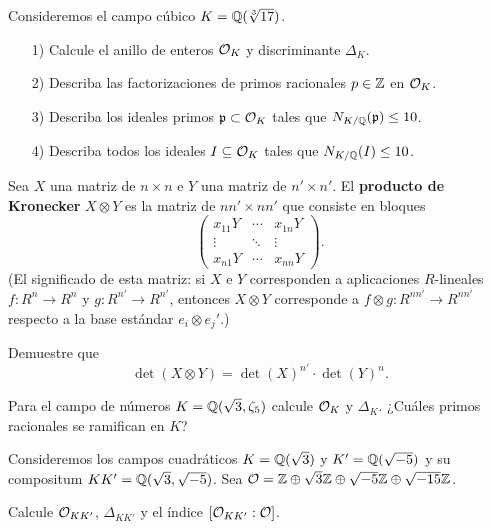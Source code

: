 \begin{ejercicio}
  Consideremos el campo cúbico $K = \mathbb{Q} (\sqrt[3]{17})$.

  \begin{enumerate}
  \item[1)] Calcule el anillo de enteros $\mathcal{O}_K$ y discriminante $\Delta_K$.
  \item[2)] Describa las factorizaciones de primos racionales $p \in \mathbb{Z}$ en
    $\mathcal{O}_K$.
  \item[3)] Describa los ideales primos $\mathfrak{p} \subset \mathcal{O}_K$
    tales que $N_{K/\mathbb{Q}} (\mathfrak{p}) \le 10$.
  \item[4)] Describa todos los ideales $I \subseteq \mathcal{O}_K$
    tales que $N_{K/\mathbb{Q}} (I) \le 10$.
  \end{enumerate}
\end{ejercicio}

\begin{ejercicio}
  \label{ejerc:producto-de-kronecker}
  Sea $X$ una matriz de $n\times n$ e $Y$ una matriz de $n'\times n'$.
  El \textbf{producto de Kronecker} $X\otimes Y$ es la matriz de
  $nn' \times nn'$ que consiste en bloques
  \[ \begin{pmatrix}
    x_{11} Y & \cdots & x_{1n} Y \\
    \vdots & \ddots & \vdots \\
    x_{n1} Y & \cdots & x_{nn} Y
  \end{pmatrix}. \]
  (El significado de esta matriz: si $X$ e $Y$ corresponden a aplicaciones
  $R$-lineales $f\colon R^n \to R^n$ y $g\colon R^{n'}\to R^{n'}$, entonces
  $X\otimes Y$ corresponde a $f\otimes g\colon R^{nn'} \to R^{nn'}$
  respecto a la base estándar $e_i\otimes e_j'$.)

  Demuestre que
  $$\det (X\otimes Y) = \det (X)^{n'} \cdot \det (Y)^n.$$
\end{ejercicio}

\begin{ejercicio}
  Para el campo de números $K = \mathbb{Q} (\sqrt{3},\zeta_5)$ calcule
  $\mathcal{O}_K$ y $\Delta_K$. ¿Cuáles primos racionales se ramifican en $K$?
\end{ejercicio}

\begin{ejercicio}
  Consideremos los campos cuadráticos $K = \mathbb{Q} (\sqrt{3})$ y
  $K' = \mathbb{Q} (\sqrt{-5})$ y su compositum $KK' = \mathbb{Q} (\sqrt{3},\sqrt{-5})$.
  Sea $\mathcal{O} = \mathbb{Z} \oplus \sqrt{3}\mathbb{Z} \oplus \sqrt{-5}\mathbb{Z} \oplus \sqrt{-15}\mathbb{Z}$.

  Calcule $\mathcal{O}_{KK'}$, $\Delta_{KK'}$ y el índice $[\mathcal{O}_{KK'} : \mathcal{O}]$.
\end{ejercicio}

